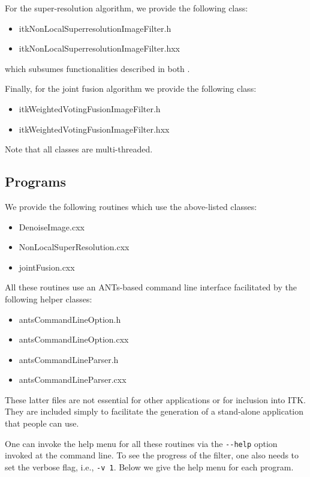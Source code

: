 \documentclass{InsightArticle}
\begin{document}
For the super-resolution algorithm, we provide the following class:
\begin{itemize}
  \item itkNonLocalSuperresolutionImageFilter.h
  \item itkNonLocalSuperresolutionImageFilter.hxx
\end{itemize}
which subsumes functionalities described in both \cite{Manjon:2010ab,Manjon:2010ac}.

Finally, for the joint fusion algorithm \cite{Wang:2013ab,Wang:2013aa} we provide
the following class:
\begin{itemize}
  \item itkWeightedVotingFusionImageFilter.h
  \item itkWeightedVotingFusionImageFilter.hxx
\end{itemize}

Note that all classes are multi-threaded.

\subsection{Programs}

We provide the following routines which use the above-listed classes:
\begin{itemize}
  \item DenoiseImage.cxx
  \item NonLocalSuperResolution.cxx
  \item jointFusion.cxx
\end{itemize}

All these routines use an ANTs-based command line interface facilitated by the
following helper classes:
\begin{itemize}
  \item antsCommandLineOption.h
  \item antsCommandLineOption.cxx
  \item antsCommandLineParser.h
  \item antsCommandLineParser.cxx
\end{itemize}
These latter files are not essential for other applications or for inclusion into ITK.
They are included simply to facilitate the generation of a stand-alone application that
people can use.

One can invoke the help menu for all these routines via the \verb#--help# option invoked at the
command line.  To see the progress of the filter, one also needs to set the verbose flag, i.e.,
\verb#-v 1#.  Below we give the help menu for each program.
\end{document}
